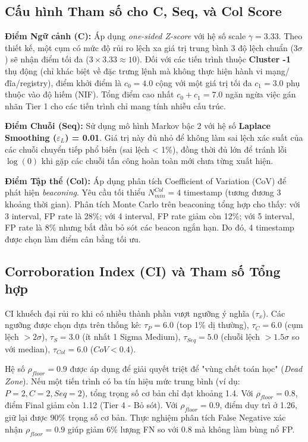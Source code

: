 \documentclass[../main.tex]{subfiles}
\begin{document}
\subsection{Cấu hình Tham số cho C, Seq, và Col Score}
\label{subsection:3.7.2}

\textbf{Điểm Ngữ cảnh (C):} Áp dụng \textit{one-sided Z-score} với hệ số scale \textbf{$\gamma = 3.33$}. Theo thiết kế, một cụm có mức độ rủi ro lệch xa giá trị trung bình 3 độ lệch chuẩn ($3\sigma$) sẽ nhận điểm tối đa ($3 \times 3.33 \approx 10$). Đối với các tiến trình thuộc \textbf{Cluster -1} thụ động (chỉ khác biệt về đặc trưng lệnh mà không thực hiện hành vi mạng/đĩa/registry), điểm khởi điểm là $c_0 = 4.0$ cộng với một giá trị tối đa $c_1 = 3.0$ phụ thuộc vào độ hiếm (NIF). Tổng điểm cao nhất $c_0 + c_1 = 7.0$ ngăn ngừa việc gán nhãn Tier 1 cho các tiến trình chỉ mang tính nhiễu cấu trúc.

\textbf{Điểm Chuỗi (Seq):} Sử dụng mô hình Markov bậc 2 với hệ số \textbf{Laplace Smoothing ($\varepsilon_L$) = 0.01}. Giá trị này đủ nhỏ để không làm sai lệch xác suất của các chuỗi chuyển tiếp phổ biến (sai lệch < 1\%), đồng thời đủ lớn để tránh lỗi $\log(0)$ khi gặp các chuỗi tấn công hoàn toàn mới chưa từng xuất hiện.

\textbf{Điểm Tập thể (Col):} Áp dụng phân tích Coefficient of Variation (CoV) để phát hiện \textit{beaconing}. Yêu cầu tối thiểu \textbf{$N_{min}^{Col} = 4$} timestamp (tương đương 3 khoảng thời gian). Phân tích Monte Carlo trên beaconing tổng hợp cho thấy: với 3 interval, FP rate là 28\%; với 4 interval, FP rate giảm còn 12\%; với 5 interval, FP rate là 8\% nhưng bắt đầu bỏ sót các beacon ngắn hạn. Do đó, 4 timestamp được chọn làm điểm cân bằng tối ưu.

\subsection{Corroboration Index (CI) và Tham số Tổng hợp}
\label{subsection:3.7.3}

CI khuếch đại rủi ro khi có nhiều thành phần vượt ngưỡng ý nghĩa ($\tau_x$). Các ngưỡng được chọn dựa trên thống kê: $\tau_P = 6.0$ (top 1\% dị thường), $\tau_C = 6.0$ (cụm lệch $>2\sigma$), $\tau_S = 3.0$ (ít nhất 1 Sigma Medium), $\tau_{Seq} = 5.0$ (chuỗi lệch $>1.5\sigma$ so với median), $\tau_{Col} = 6.0$ ($CoV < 0.4$). 

Hệ số \textbf{$\rho_{floor} = 0.9$} được áp dụng để giải quyết triệt để "vùng chết toán học" (\textit{Dead Zone}). Nếu một tiến trình có ba tín hiệu mức trung bình (ví dụ: $P=2, C=2, Seq=2$), tổng trọng số cơ bản chỉ đạt khoảng 1.4. Với $\rho_{floor} = 0.8$, điểm Final giảm còn 1.12 (Tier 4 - Bỏ sót). Với $\rho_{floor} = 0.9$, điểm duy trì ở 1.26, giữ lại được 90\% trọng số cơ bản. Thực nghiệm phân tích False Negative xác nhận $\rho_{floor} = 0.9$ giúp giảm 6\% lượng FN so với 0.8 mà không làm bùng nổ FP.
\end{document}
